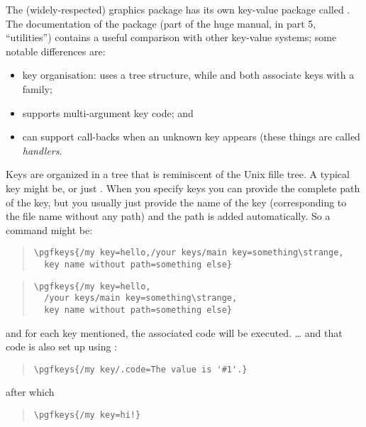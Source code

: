 The (widely-respected)  graphics package has its own
key-value package called .  The documentation of the
package (part of the huge  manual, in part 5,
``utilities'') contains a useful comparison with other key-value
systems; some notable differences are:
\begin{itemize}
\item key organisation:  uses a tree structure, while
   and  both associate keys with a family;
\item {} supports multi-argument key code; and
\item {} can support call-backs when an unknown key
  appears (these things are called \emph{handlers}.
\end{itemize}
Keys are organized in a tree that is reminiscent of the Unix fille
tree.  A typical key might be,  or
just .  When you specify keys you can provide the complete
path of the key, but you usually just provide the name of the key
(corresponding to the file name without any path) and the path is
added automatically.  So a  command might be:
\begin{wideversion}
\begin{quote}
\begin{verbatim}
\pgfkeys{/my key=hello,/your keys/main key=something\strange,
  key name without path=something else}
\end{verbatim}
\end{quote}
\end{wideversion}
\begin{narrowversion}
\begin{quote}
\begin{verbatim}
\pgfkeys{/my key=hello,
  /your keys/main key=something\strange,
  key name without path=something else}
\end{verbatim}
\end{quote}
\end{narrowversion}
and for each key mentioned, the associated code will be executed.
\dots{} and that code is also set up using :
\begin{quote}
\begin{verbatim}
\pgfkeys{/my key/.code=The value is '#1'.}
\end{verbatim}
\end{quote}
after which
\begin{quote}
\begin{verbatim}
\pgfkeys{/my key=hi!}
\end{verbatim}
\end{quote}
